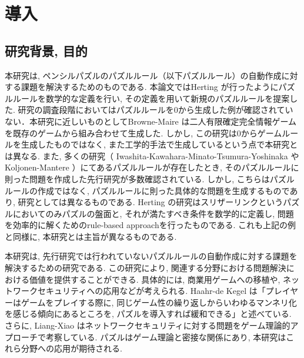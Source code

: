 \chapter{導入}
\section{研究背景, 目的}\label{section:Introduction}
本研究は, ペンシルパズルのパズルルール（以下パズルルール）の自動作成に対する課題を解決するためのものである. 本論文ではHerting \cite{Herting2004}が行ったようにパズルルールを数学的な定義を行い, その定義を用いて新規のパズルルールを提案した. 研究の調査段階においてはパズルルールを0から生成した例が確認されていない．本研究に近しいものとしてBrowne-Maire \cite{Browne2010}は二人有限確定完全情報ゲームを既存のゲームから組み合わせて生成した. しかし, この研究は0からゲームルールを生成したものではなく, また工学的手法で生成しているという点で本研究とは異なる. また, 多くの研究（
Iwashita-Kawahara-Minato-Tsumura-Yoshinaka
\cite{Yoshinaka2012}やKoljonen-Mantere \cite{Mantere2007}）にてあるパズルルールが存在したとき, そのパズルルールに則った問題を作成した先行研究が多数確認されている. しかし, こちらはパズルルールの作成ではなく, パズルルールに則った具体的な問題を生成するものであり, 研究としては異なるものである. Herting	 \cite{Herting2004}の研究はスリザーリンクというパズルにおいてのみパズルの盤面と, それが満たすべき条件を数学的に定義し, 問題を効率的に解くためのrule-based approachを行ったものである. これも上記の例と同様に, 本研究とは主旨が異なるものである.

本研究は, 先行研究では行われていないパズルルールの自動作成に対する課題を解決するための研究である. この研究により, 関連する分野における問題解決における価値を提供することができる. 具体的には, 商業用ゲームへの移植や, ネットワークセキュリティへの応用などが考えられる. Haahr-de Kegel \cite{Barbara2020}は「プレイヤーはゲームをプレイする際に, 同じゲーム性の繰り返しからいわゆるマンネリ化を感じる傾向にあるところを, パズルを導入すれば緩和できる」と述べている. さらに, Liang-Xiao \cite{Liang2013}はネットワークセキュリティに対する問題をゲーム理論的アプローチで考察している. パズルはゲーム理論と密接な関係にあり, 	本研究はこれら分野への応用が期待される.

